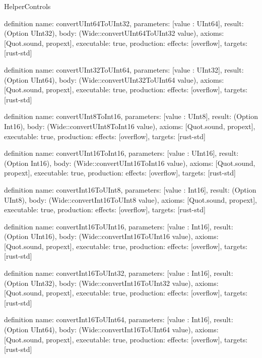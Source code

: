 \begin{lexlean}{HelperControls}
\begin{semanticmodule}
definition{
  name: convertUInt64ToUInt32,
  parameters: [value : UInt64],
  result: (Option UInt32),
  body: (Wide::convertUInt64ToUInt32 value),
  axioms: [Quot.sound, propext],
  executable: true,
  production: {effects: [overflow], targets: [rust-std]}
}

definition{
  name: convertUInt32ToUInt64,
  parameters: [value : UInt32],
  result: (Option UInt64),
  body: (Wide::convertUInt32ToUInt64 value),
  axioms: [Quot.sound, propext],
  executable: true,
  production: {effects: [overflow], targets: [rust-std]}
}

definition{
  name: convertUInt8ToInt16,
  parameters: [value : UInt8],
  result: (Option Int16),
  body: (Wide::convertUInt8ToInt16 value),
  axioms: [Quot.sound, propext],
  executable: true,
  production: {effects: [overflow], targets: [rust-std]}
}

definition{
  name: convertUInt16ToInt16,
  parameters: [value : UInt16],
  result: (Option Int16),
  body: (Wide::convertUInt16ToInt16 value),
  axioms: [Quot.sound, propext],
  executable: true,
  production: {effects: [overflow], targets: [rust-std]}
}

definition{
  name: convertInt16ToUInt8,
  parameters: [value : Int16],
  result: (Option UInt8),
  body: (Wide::convertInt16ToUInt8 value),
  axioms: [Quot.sound, propext],
  executable: true,
  production: {effects: [overflow], targets: [rust-std]}
}

definition{
  name: convertInt16ToUInt16,
  parameters: [value : Int16],
  result: (Option UInt16),
  body: (Wide::convertInt16ToUInt16 value),
  axioms: [Quot.sound, propext],
  executable: true,
  production: {effects: [overflow], targets: [rust-std]}
}

definition{
  name: convertInt16ToUInt32,
  parameters: [value : Int16],
  result: (Option UInt32),
  body: (Wide::convertInt16ToUInt32 value),
  axioms: [Quot.sound, propext],
  executable: true,
  production: {effects: [overflow], targets: [rust-std]}
}

definition{
  name: convertInt16ToUInt64,
  parameters: [value : Int16],
  result: (Option UInt64),
  body: (Wide::convertInt16ToUInt64 value),
  axioms: [Quot.sound, propext],
  executable: true,
  production: {effects: [overflow], targets: [rust-std]}
}
\end{semanticmodule}
\end{lexlean}
